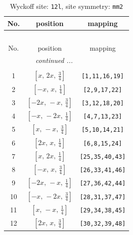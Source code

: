 \documentclass[fleqn,8pt]{jsarticle}
\begin{document}
\begin{longtable}{ccc}
\caption{Wyckoff site: {\tt 12l}, site symmetry: {\tt mm2}}
 \\
 \hline \hline
No. & position & mapping \\ \hline \endfirsthead

\multicolumn{2}{l}{\tablename\ \thetable{}} \\
 \hline \hline
No. & position & mapping \\ \hline \endhead

 \hline \hline
\multicolumn{2}{r}{\footnotesize\it continued ...} \\ \endfoot

 \hline \hline
\multicolumn{2}{r}{} \\ \endlastfoot

1 & $\left[ x,\, 2 x,\, \frac{3}{4} \right]$ & {\tt [1,11,16,19]} \\ \hline
2 & $\left[ - x,\, x,\, \frac{1}{4} \right]$ & {\tt [2,9,17,22]} \\ \hline
3 & $\left[ - 2 x,\, - x,\, \frac{3}{4} \right]$ & {\tt [3,12,18,20]} \\ \hline
4 & $\left[ - x,\, - 2 x,\, \frac{1}{4} \right]$ & {\tt [4,7,13,23]} \\ \hline
5 & $\left[ x,\, - x,\, \frac{3}{4} \right]$ & {\tt [5,10,14,21]} \\ \hline
6 & $\left[ 2 x,\, x,\, \frac{1}{4} \right]$ & {\tt [6,8,15,24]} \\ \hline
7 & $\left[ x,\, 2 x,\, \frac{1}{4} \right]$ & {\tt [25,35,40,43]} \\ \hline
8 & $\left[ - x,\, x,\, \frac{3}{4} \right]$ & {\tt [26,33,41,46]} \\ \hline
9 & $\left[ - 2 x,\, - x,\, \frac{1}{4} \right]$ & {\tt [27,36,42,44]} \\ \hline
10 & $\left[ - x,\, - 2 x,\, \frac{3}{4} \right]$ & {\tt [28,31,37,47]} \\ \hline
11 & $\left[ x,\, - x,\, \frac{1}{4} \right]$ & {\tt [29,34,38,45]} \\ \hline
12 & $\left[ 2 x,\, x,\, \frac{3}{4} \right]$ & {\tt [30,32,39,48]} \\
\end{longtable}
\renewcommand{\arraystretch}{1.2}
\end{document}
